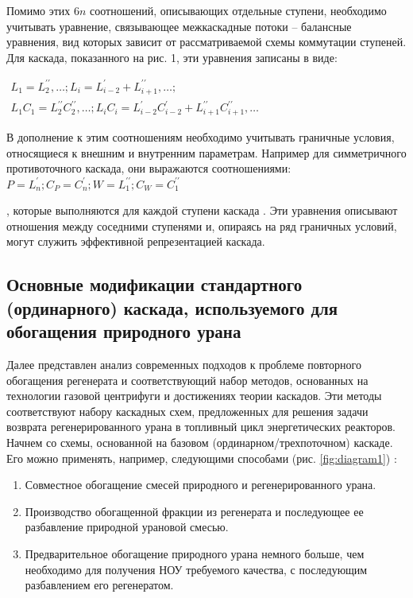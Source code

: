 Помимо этих 6$n$ соотношений, описывающих отдельные ступени, необходимо учитывать уравнение, связывающее межкаскадные потоки -- балансные уравнения, вид которых зависит от рассматриваемой схемы коммутации ступеней. Для каскада, показанного на рис. 1, эти уравнения записаны в виде:

$\begin{array}{c}
  {L_{1}=L_{2}^{\prime \prime}, \ldots ; L_{i}=L_{i-2}^{\prime}+L_{i+1}^{\prime \prime}, \ldots ;} \\
  {L_{1} C_{1}=L_{2}^{\prime \prime} C_{2}^{\prime \prime}, \ldots ; L_{i} C_{i}=L_{i-2}^{\prime} C_{i-2}^{\prime}+L_{i+1}^{\prime \prime} C_{i+1}^{\prime \prime}, \ldots}
\end{array}$

В дополнение к этим соотношениям необходимо учитывать граничные условия, относящиеся к внешним и внутренним параметрам. Например для симметричного противоточного каскада, они выражаются соотношениями: 
$P=L_{n}^{\prime} ; C_{P}=C_{n}^{\prime} ; W=L_{1}^{\prime \prime} ; C_{W}=C_{1}^{\prime \prime}$

, которые выполняются для каждой ступени каскада \cite{palkinDeterminationOptimalParameters2012}. Эти уравнения описывают отношения между соседними ступенями и, опираясь на ряд граничных условий, могут служить эффективной репрезентацией каскада.

\subsection{Основные модификации стандартного (ординарного) каскада, используемого для обогащения природного урана}\label{sec:ch1/sec2.2}
Далее представлен анализ современных подходов к проблеме повторного обогащения регенерата и соответствующий набор методов, основанных на технологии газовой центрифуги и достижениях теории каскадов. Эти методы соответствуют набору каскадных схем, предложенных для решения задачи возврата регенерированного урана в топливный цикл энергетических реакторов.
Начнем со схемы, основанной на базовом (ординарном/трехпоточном) каскаде.
Его можно применять, например, следующими способами (рис. \ref{fig:diagram1}) \cite{smirnovKaskadnyeShemyZadachah2012}:
\begin{enumerate}
  \item Совместное обогащение смесей природного и регенерированного урана.
  \item Производство обогащенной фракции из регенерата и последующее ее разбавление природной урановой смесью.
  \item Предварительное обогащение природного урана немного больше, чем необходимо для получения НОУ требуемого качества, с последующим разбавлением его регенератом.
\end{enumerate}

